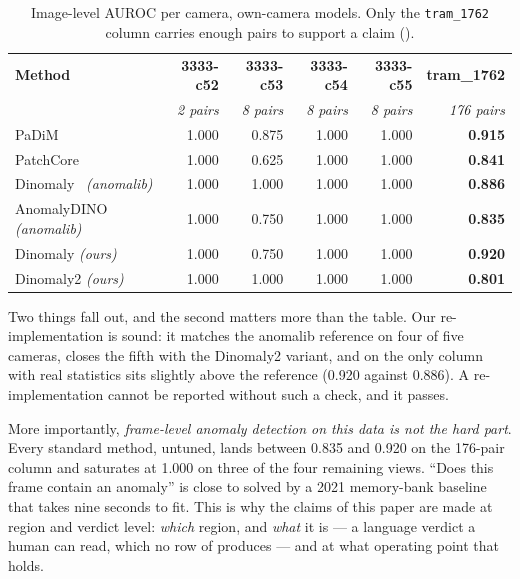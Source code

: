 \begin{table}[t]
\centering
\caption{Image-level AUROC per camera, own-camera models. Only the
\texttt{tram\_1762} column carries enough pairs to support a claim
().}
\label{tab:baselines}
\begin{tabular}{@{}lrrrrr@{}}
\toprule
\textbf{Method} & \textbf{3333-c52} & \textbf{3333-c53} & \textbf{3333-c54} &
\textbf{3333-c55} & \textbf{tram\_1762} \\
 & \emph{2 pairs} & \emph{8 pairs} & \emph{8 pairs} & \emph{8 pairs} & \emph{176 pairs} \\
\midrule
PaDiM~\cite{Defard_2021}      & 1.000 & 0.875 & 1.000 & 1.000 & \textbf{0.915} \\
PatchCore~\cite{Roth_2022}    & 1.000 & 0.625 & 1.000 & 1.000 & \textbf{0.841} \\
Dinomaly~\cite{Guo_2025} \emph{(anomalib)}    & 1.000 & 1.000 & 1.000 & 1.000 & \textbf{0.886} \\
AnomalyDINO~\cite{Damm_2025} \emph{(anomalib)} & 1.000 & 0.750 & 1.000 & 1.000 & \textbf{0.835} \\
\midrule
Dinomaly \emph{(ours)}        & 1.000 & 0.750 & 1.000 & 1.000 & \textbf{0.920} \\
Dinomaly2 \emph{(ours)}       & 1.000 & 1.000 & 1.000 & 1.000 & \textbf{0.801} \\
\bottomrule
\end{tabular}
\end{table}

Two things fall out, and the second matters more than the table. Our
re-implementation is sound: it matches the anomalib reference on four of five
cameras, closes the fifth with the Dinomaly2 variant, and on the only column
with real statistics sits slightly above the reference (0.920 against 0.886).
A re-implementation cannot be reported without such a check, and it passes.

More importantly, \emph{frame-level anomaly detection on this data is not the
hard part}. Every standard method, untuned, lands between 0.835 and 0.920 on
the 176-pair column and saturates at 1.000 on three of the four remaining
views. ``Does this frame contain an anomaly'' is close to solved by a 2021
memory-bank baseline that takes nine seconds to fit. This is why the claims of
this paper are made at region and verdict level: \emph{which} region, and
\emph{what} it is --- a language verdict a human can read, which no row of
 produces --- and at what operating point that holds.

